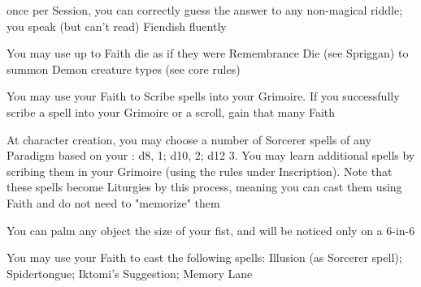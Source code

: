 {






\GOD[
Name=Cthulhu,
Link=small-god-cthulhu,
GodOf=Arbiter of Mysteries and Riddles,
Holy=A piece of jewelry depicting an octopus
]


once per Session, you can correctly guess the answer to any non-magical riddle; you speak (but can't read) Fiendish fluently


You may use up to \LVL Faith die as if they were Remembrance Die (see Spriggan) to summon Demon creature types (see core rules)




\GOD[
Name=Hecate,
Link=small-god-hecate,
GodOf=Archfiend of Wizardry,
Holy=your Grimoire
]


You may use your Faith to Scribe spells into your Grimoire. If you successfully scribe a spell into your Grimoire or a scroll, gain that many Faith


At character creation, you may choose a number of Sorcerer spells of any Paradigm based on your \INT:  d8, 1; d10, 2; d12 3.  You may learn additional spells by scribing them in your Grimoire (using the rules under Inscription).  Note that these spells become Liturgies by this process, meaning you can cast them using Faith and do not need to "memorize" them




\GOD[
Name=Iktomi,
Link=small-god-iktomi,
GodOf=God of Tricksters,
Holy=a small puppet worn from the belt or neck
]


You can palm any object the size of your fist, and will be noticed only on a 6-in-6


You may use your Faith to cast the following spells: Illusion (as Sorcerer spell); Spidertongue; Iktomi's Suggestion; Memory Lane

}

